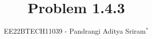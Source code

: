\documentclass[journal,12pt,twocolumn]{IEEEtran}
\theoremstyle{remark}
\begin{document}
%




\vspace{3cm}

\title{
Problem 1.4.3
}
\author{EE22BTECH11039 - Pandrangi Aditya Sriram$^{*}$%
}

%
%
%
% 
%



% 
\end{document}
